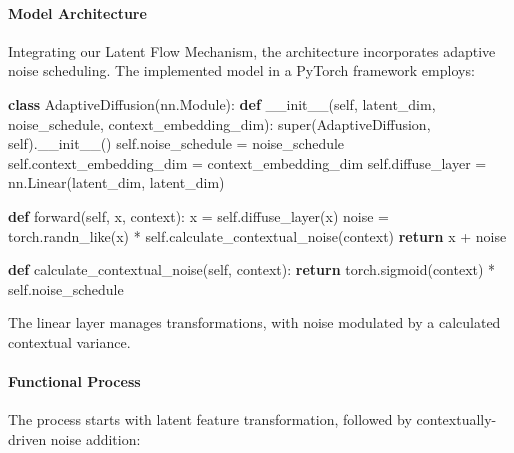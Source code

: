 \paragraph{Model Architecture}
Integrating our Latent Flow Mechanism, the architecture incorporates adaptive noise scheduling. The implemented model in a PyTorch framework employs:


\begin{algorithm}
\caption{AdaptiveDiffusion}
\label{alg:adaptive_diffusion}
\begin{algorithmic}[1]

\STATE \textbf{class} AdaptiveDiffusion(nn.Module):
\STATE \hspace{0.5cm} \textbf{def} \_\_init\_\_(self, latent\_dim, noise\_schedule, context\_embedding\_dim):
\STATE \hspace{1cm} super(AdaptiveDiffusion, self).\_\_init\_\_()
\STATE \hspace{1cm} self.noise\_schedule = noise\_schedule
\STATE \hspace{1cm} self.context\_embedding\_dim = context\_embedding\_dim
\STATE \hspace{1cm} self.diffuse\_layer = nn.Linear(latent\_dim, latent\_dim)

\STATE
\STATE \hspace{0.5cm} \textbf{def} forward(self, x, context):
\STATE \hspace{1cm} x = self.diffuse\_layer(x)
\STATE \hspace{1cm} noise = torch.randn\_like(x) * self.calculate\_contextual\_noise(context)
\STATE \hspace{1cm} \textbf{return} x + noise

\STATE
\STATE \hspace{0.5cm} \textbf{def} calculate\_contextual\_noise(self, context):
\STATE \hspace{1cm} \textbf{return} torch.sigmoid(context) * self.noise\_schedule

\end{algorithmic}
\end{algorithm}
The linear layer manages transformations, with noise modulated by a calculated contextual variance.

\paragraph{Functional Process}
The process starts with latent feature transformation, followed by contextually-driven noise addition:

